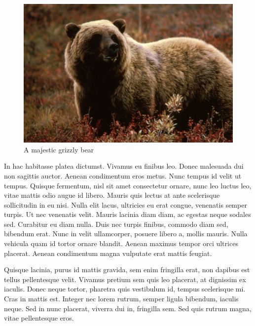 \documentclass[10pt, a4paper]{article}%
\begin{document}
\begin{multicols}{2}
\begin{figure}
	\includegraphics[width=\linewidth]{bear.jpg} %
	\caption{A majestic grizzly bear} %
	\label{bear} %
\end{figure}

In hac habitasse platea dictumst. Vivamus eu finibus leo. Donec malesuada dui non sagittis auctor. Aenean condimentum eros metus. Nunc tempus id velit ut tempus. Quisque fermentum, nisl sit amet consectetur ornare, nunc leo luctus leo, vitae mattis odio augue id libero. Mauris quis lectus at ante scelerisque sollicitudin in eu nisi. Nulla elit lacus, ultricies eu erat congue, venenatis semper turpis. Ut nec venenatis velit. Mauris lacinia diam diam, ac egestas neque sodales sed. Curabitur eu diam nulla. Duis nec turpis finibus, commodo diam sed, bibendum erat. Nunc in velit ullamcorper, posuere libero a, mollis mauris. Nulla vehicula quam id tortor ornare blandit. Aenean maximus tempor orci ultrices placerat. Aenean condimentum magna vulputate erat mattis feugiat.

Quisque lacinia, purus id mattis gravida, sem enim fringilla erat, non dapibus est tellus pellentesque velit. Vivamus pretium sem quis leo placerat, at dignissim ex iaculis. Donec neque tortor, pharetra quis vestibulum id, tempus scelerisque mi. Cras in mattis est. Integer nec lorem rutrum, semper ligula bibendum, iaculis neque. Sed in nunc placerat, viverra dui in, fringilla sem. Sed quis rutrum magna, vitae pellentesque eros.



\end{multicols}
\end{document}
